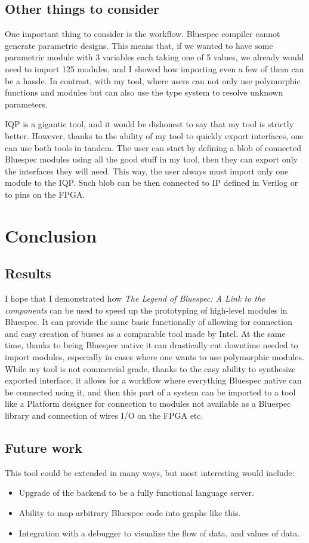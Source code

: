 \documentclass[12pt]{report}
\begin{document}
\section{Other things to consider} 
One important thing to consider is the workflow. Bluespec compiler cannot generate parametric designs. This means that, if we wanted to have some parametric module with 3 variables each taking one of 5 values, we already would need to import 125 modules, and I showed how importing even a few of them can be a hassle. In contrast, with my tool, where users can not only use polymorphic functions and modules but can also use the type system to resolve unknown parameters. 
\par 
IQP is a gigantic tool, and it would be dishonest to say that my tool is strictly better. However, thanks to the ability of my tool to quickly export interfaces, one can use both tools in tandem. The user can start by defining a blob of connected Bluespec modules using all the good stuff in my tool, then they can export only the interfaces they will need. This way, the user always must import only one module to the IQP. Such blob can be then connected to IP defined in Verilog or to pins on the FPGA.  
\chapter{Conclusion} 
\section{Results} 
I hope that I demonstrated how \emph{The Legend of Bluespec: A Link to the components} can be used to speed up the prototyping of high-level modules in Bluespec. It can provide the same basic functionally of allowing for connection and easy creation of busses as a comparable tool made by Intel. At the same time, thanks to being Bluespec native it can drastically cut downtime needed to import modules, especially in cases where one wants to use polymorphic modules. While my tool is not commercial grade, thanks to the easy ability to synthesize exported interface, it allows for a workflow where everything Bluespec native can be connected using it, and then this part of a system can be imported to a tool like a Platform designer for connection to modules not available as a Bluespec library and connection of wires I/O on the FPGA etc. 
\section{Future work} 
This tool could be extended in many ways, but most interesting would include: 
\begin{itemize} 
   \item Upgrade of the backend to be a fully functional language server. 
   \item Ability to map arbitrary Bluespec code into graphs like this. 
   \item Integration with a debugger to visualize the flow of data, and values of data. 
\end{itemize} 
\end{document}
